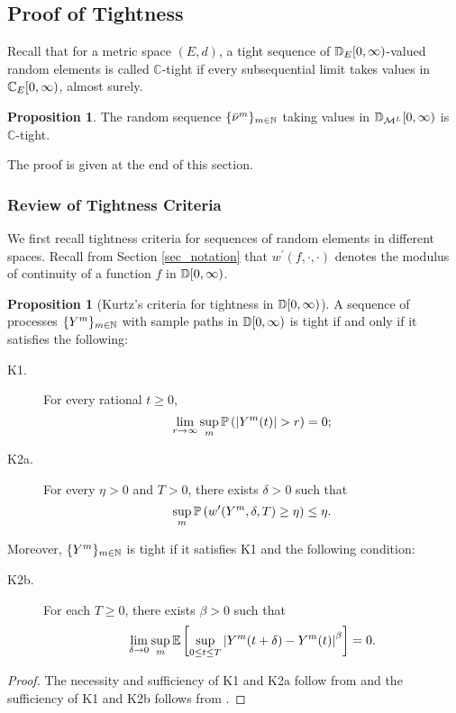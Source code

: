 \documentclass{article}
\theoremstyle{definition}
\newtheorem{proposition}[theorem]{Proposition}
\numberwithin{equation}{section}
\begin{document}
\subsection{Proof of Tightness}\label{sec_tight}

Recall that for a metric space $(E,d)$, a tight sequence of $\mathbb{D}_E[0,\infty)$-valued random elements is called $\mathbb{C}$-tight if every subsequential limit takes values in $\mathbb{C}_E[0,\infty)$, almost surely. 

\begin{proposition}\label{prop_nutight}
  The random sequence $\{\bar{\nu}^m\}_{m\in\mathbb{N}}$ taking values in $\mathbb{D}_{\mathcal{M}^L}[0,\infty)$ is  $\mathbb{C}$-tight.
\end{proposition}

The proof is given at the end of this section.

\subsubsection{Review of Tightness Criteria}\label{sec_tightCriteria}

We first recall tightness criteria for sequences of random elements in different spaces. Recall from Section \ref{sec_notation} that $w^\prime(f,\cdot,\cdot)$ denotes the modulus of continuity of a function $f$ in $\mathbb{D}[0,\infty)$.

\begin{proposition}[Kurtz's criteria for tightness in $\mathbb{D}[0,\infty)$]\label{Kurtz}
A sequence of processes $\{Y^m\}_{m\in\mathbb{N}}$ with sample paths in $\mathbb{D}[0,\infty)$ is tight if and only if it satisfies the following:
\begin{description}
\item [K1.] For every rational $t\geq0$,
\begin{equation}
  \lim_{r\to\infty} \sup_{m}\Prob{|Y^m(t)|>r}=0;
\end{equation}
\end{description}
\begin{description}
  \item[K2a.] For every $\eta>0$ and $T>0$, there exists $\delta>0$ such that
  \begin{equation}
    \sup_m\mathbb{P}\left(w^\prime(Y^m,\delta,T)\geq\eta\right)\leq \eta.
  \end{equation}
\end{description}
Moreover, $\{Y^m\}_{m\in\mathbb{N}}$ is tight if it satisfies K1 and the following condition:
\begin{description}
  \item[K2b.] For each $T\geq 0$, there exists $\beta>0$ such that
  \begin{equation}
    \lim_{\delta\to 0}\sup_{m}\mathbb{E}\left[\sup_{0\leq t\leq T}\left|Y^m(t+\delta)-Y^m(t)\right|^\beta\right]=0.
  \end{equation}
\end{description}
\end{proposition}
\begin{proof}
The necessity and sufficiency of K1 and K2a follow from \cite[Theorem 3.7.2]{KurtzBook} and the sufficiency of K1 and K2b follows from \cite[Theorems 3.7.2 and 3.8.6 and Remark 3.8.7]{KurtzBook}.
\end{proof}
\end{document}
